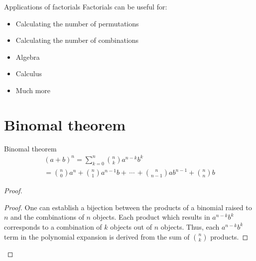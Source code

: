 \documentclass[11pt]{beamer}
\begin{document}
	\begin{frame}{Applications of factorials}
		Factorials can be useful for:
		\begin{itemize}
			\item <2-> Calculating the number of permutations
			\item <3-> Calculating the number of combinations
			\item <4-> Algebra 
			\item <5-> Calculus
			\item <6-> Much more 
		\end{itemize}
	\end{frame}
	\section{Binomal theorem}
	\begin{frame}{Binomal theorem}
	\begin{multline}
	(a + b)^n = \sum_{k=0}^{n}{n \choose k}a^{n-k}b^k  \\= {n \choose 0}a^n + {n \choose 1}a^{n-1}b + \, \cdots \, + {n \choose n-1}ab^{n-1} + {n \choose n}b
	\end{multline}
	\begin{proof}
		\begin{proof}
			One can establish a bijection between the products of a binomial
			raised to $n$ and the combinations of $n$ objects. Each product which results
			in $a^{n-k}b^k$ corresponds to a combination of $k$ objects out of $n$ objects. Thus, each  $a^{n-k} b^k$ term in the polynomial expansion is derived from the sum of ${n \choose k}$ products.
		\end{proof}
	\end{proof}
	\end{frame}
\end{document}
